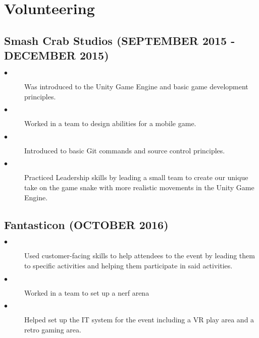 \documentclass{article}
\begin{document}
\section{Volunteering}
\noindent
\hfill
\begin{minipage}[t]{1\textwidth}
    \subsection{Smash Crab Studios \footnotesize{(SEPTEMBER 2015 - DECEMBER 2015)}}
    \normalsize{}
    \begin{description}
        \item[$\bullet$] Was introduced to the Unity Game Engine and basic game development principles. 
        \item[$\bullet$] Worked in a team to design abilities for a mobile game.  
        \item[$\bullet$] Introduced to basic Git commands and source control principles.
        \item[$\bullet$] Practiced Leadership skills by leading a small team to create our unique take on the game snake with more realistic movements in the Unity Game Engine. 
    \end{description}

    \subsection{Fantasticon \footnotesize{(OCTOBER 2016)}}
    \normalsize{}
    \begin{description}
        \item[$\bullet$] Used customer-facing skills to help attendees to the event by leading them to specific activities and helping them participate in said activities. 
        \item[$\bullet$] Worked in a team to set up a nerf arena
        \item[$\bullet$] Helped set up the IT system for the event including a VR play area and a retro gaming area. 
    \end{description}

\end{minipage}
\end{document}
